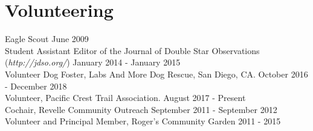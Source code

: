\section{Volunteering}

Eagle Scout
    \hfill June 2009\\
Student Assistant Editor of the Journal of Double Star Observations ({\sl http://jdso.org/})
    \hfill January 2014 - January 2015\\
Volunteer Dog Foster, Labs And More Dog Rescue, San Diego, CA. 
    \hfill  October 2016 - December 2018\\
Volunteer, Pacific Crest Trail Association. 
    \hfill  August 2017 - Present\\
Cochair, Revelle Community Outreach 
    \hfill September 2011 - September 2012\\
Volunteer and Principal Member, Roger’s Community Garden 
    \hfill  2011 - 2015

